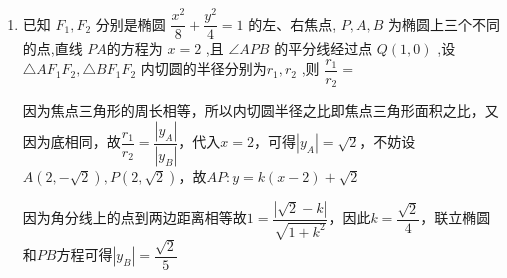 \begin{enumerate}
    \item 已知 ${F}_{1},{F}_{2}$ 分别是椭圆 $\dfrac{{x}^{2}}{8} + \dfrac{{y}^{2}}{4} = 1$ 的左、右焦点, $P,A,B$ 为椭圆上三个不同的点,直线 ${PA}$的方程为 $x = 2$ ,且 $\angle {APB}$ 的平分线经过点 $Q\left( {1,0}\right)$ ,设 $\bigtriangleup A{F}_{1}{F}_{2},\bigtriangleup B{F}_{1}{F}_{2}$ 内切圆的半径分别为${r}_{1},{r}_{2}$ ,则 $\dfrac{{r}_{1}}{{r}_{2}} =$ 
    \begin{jieda}
        因为焦点三角形的周长相等，所以内切圆半径之比即焦点三角形面积之比，又因为底相同，故$\dfrac{r_1}{r_2} = \dfrac{|y_A|}{|y_B|}$，代入$x = 2$，可得$|y_A| = \sqrt{2}$，不妨设$A(2, -\sqrt{2}), P(2, \sqrt{2})$，故$AP: y = k(x-2)+\sqrt{2}$

        因为角分线上的点到两边距离相等故$1 = \dfrac{|\sqrt{2}-k|}{\sqrt{1+k^2}}$，因此$k = \dfrac{\sqrt{2}}{4}$，联立椭圆和$PB$方程可得$|y_B| = \dfrac{\sqrt{2}}{5}$
    \end{jieda}
\end{enumerate}
